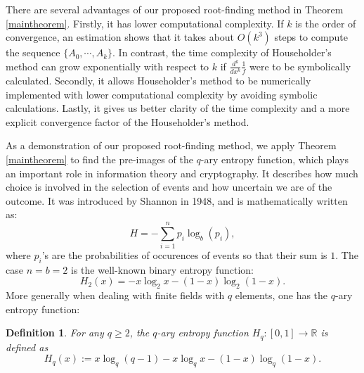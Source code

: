 \documentclass{article}
\newtheorem{definition}{Definition}%
\begin{document}
There are several advantages of our proposed root-finding method in Theorem \ref{maintheorem}. Firstly, it has lower computational complexity. If $k$ is the order of convergence, an estimation shows that it takes about $O(k^{3})$ steps to compute the sequence $\{A_{0},\cdots,A_{k}\}$. In contrast, the time complexity of Householder's method can grow exponentially with respect to $k$ if  $\frac{d^{k}}{dx^{k}}\frac{1}{f}$ were to be symbolically calculated. Secondly, it allows Householder's method to be numerically implemented with lower computational complexity by avoiding symbolic calculations. Lastly, it gives us better clarity of the time complexity and a more explicit convergence factor of the Householder's method.

As a demonstration of our proposed root-finding method, we apply Theorem \ref{maintheorem} to  find the pre-images of the $q$-ary entropy function, which plays an important role in information theory and cryptography. It describes how much choice is involved in the selection of events and how uncertain we are of the outcome. It was introduced by Shannon \cite{Shannon1948, MacKay-2003} in 1948, and is mathematically written as:
\[
H = -\sum_{i=1}^{n}p_{i}\log_{b}(p_{i}),
\]
where $p_{i}$'s are the probabilities of occurences of events so that their sum is $1$. The case $n=b=2$ is the well-known binary entropy function:
\begin{equation}\label{H2}
H_{2}(x)=-x\log_{2}x - (1-x)\log_{2}(1-x).
\end{equation}
More generally when dealing with finite fields with $q$ elements, one has the $q$-ary entropy function:
\medskip
\begin{definition}\label{Hq}
	For any $q\geq 2$, the $q$-ary entropy function $H_{q}:[0,1]\longrightarrow \mathbb{R}$ is defined as 
	\[
	H_{q}(x) :=x\log_{q}(q-1)-x\log_{q}x-(1-x)\log_{q}(1-x).
	\]
\end{definition}
\end{document}

